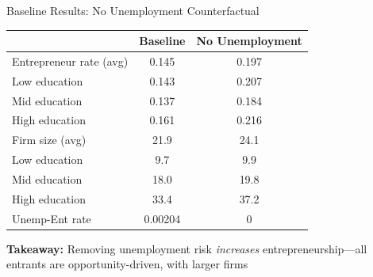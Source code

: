 \documentclass[aspectratio=169, 11pt]{beamer}
\begin{document}
\begin{frame}{Baseline Results: No Unemployment Counterfactual}
    \begin{table}
        \centering
        \small
        \begin{tabular}{lcc}
            \toprule
            & Baseline & No Unemployment \\
            \midrule
            Entrepreneur rate (avg) & 0.145 & 0.197 \\
            \quad Low education & 0.143 & 0.207 \\
            \quad Mid education & 0.137 & 0.184 \\
            \quad High education & 0.161 & 0.216 \\
            \midrule
            Firm size (avg) & 21.9 & 24.1 \\
            \quad Low education & 9.7 & 9.9 \\
            \quad Mid education & 18.0 & 19.8 \\
            \quad High education & 33.4 & 37.2 \\
            \midrule
            Unemp-Ent rate & 0.00204 & 0 \\
            \bottomrule
        \end{tabular}
    \end{table}

    \textbf{Takeaway:} Removing unemployment risk \textit{increases} entrepreneurship---all entrants are opportunity-driven, with larger firms
\end{frame}

\end{document}

